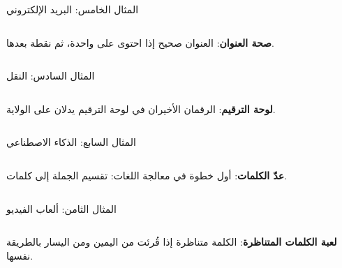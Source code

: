 \documentclass[aspectratio=169, 11pt, t, xcolor={table}]{beamer}
\begin{document}
\begin{frame}[t]{المثال الخامس: البريد الإلكتروني}
    \begin{columns}[T]
        {\small \textbf{صحة العنوان}: العنوان صحيح إذا احتوى على  واحدة، ثم نقطة بعدها.\par}
        \vspace{0.3cm}
    \end{columns}
\end{frame}

\begin{frame}[t]{المثال السادس: النقل}
    \begin{columns}[T]
        {\small \textbf{لوحة الترقيم}: الرقمان الأخيران في لوحة الترقيم يدلان على الولاية.\par}
        \vspace{0.3cm}
    \end{columns}
\end{frame}

\begin{frame}[t]{المثال السابع: الذكاء الاصطناعي}
    \begin{columns}[T]
        {\small \textbf{عدّ الكلمات}: أول خطوة في معالجة اللغات: تقسيم الجملة إلى كلمات.\par}
        \vspace{0.3cm}
    \end{columns}
\end{frame}

\begin{frame}[t]{المثال الثامن: ألعاب الفيديو}
    \begin{columns}[T]
        {\small \textbf{لعبة الكلمات المتناظرة}: الكلمة متناظرة إذا قُرئت من اليمين ومن اليسار بالطريقة نفسها.\par}
        \vspace{0.3cm}
    \end{columns}
\end{frame}
\end{document}
